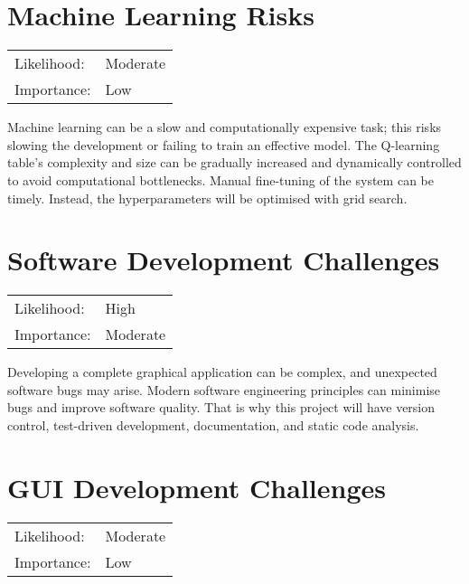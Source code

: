 \documentclass[]{final_report}
\begin{document}
\section{Machine Learning Risks}

\begin{center}
    \begin{tabular}{l l  }
    Likelihood: & Moderate \\
    Importance: & Low \\
    \end{tabular}
  \end{center}

Machine learning can be a slow and computationally expensive task; this risks slowing the development or failing to train an effective model. The Q-learning table's complexity and size can be gradually increased and dynamically controlled to avoid computational bottlenecks. Manual fine-tuning of the system can be timely. Instead, the hyperparameters will be optimised with grid search. 

\section{Software Development Challenges}

\begin{center}
    \begin{tabular}{l l  }
    Likelihood: & High \\
    Importance: & Moderate \\
    \end{tabular}
  \end{center}

Developing a complete graphical application can be complex, and unexpected software bugs may arise. Modern software engineering principles can minimise bugs and improve software quality. That is why this project will have version control, test-driven development, documentation, and static code analysis. 

\section{GUI Development Challenges}

\begin{center}
    \begin{tabular}{l l  }
    Likelihood: & Moderate \\
    Importance: & Low \\
    \end{tabular}
  \end{center}
\end{document}

